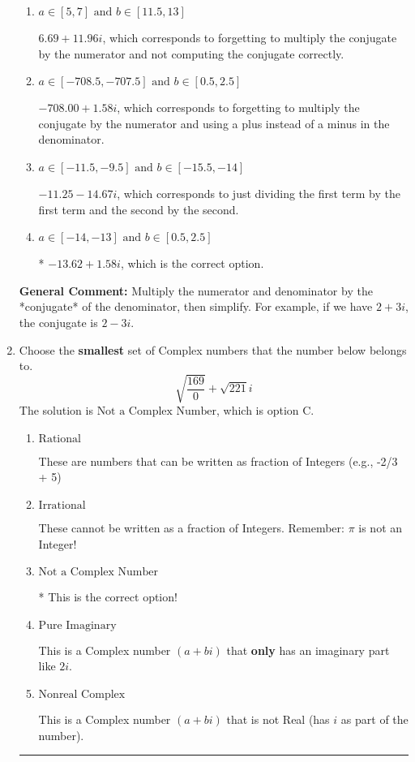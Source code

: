 \documentclass{extbook}[14pt]
\newcommand{\litem}[1]{\item #1

\rule{\textwidth}{0.4pt}}
\begin{document}
\begin{enumerate}
{\begin{enumerate}[label=\Alph*.]
 $-13.62  + 82.00 i$, which corresponds to forgetting to multiply the conjugate by the numerator.
\item \( a \in [5, 7] \text{ and } b \in [11.5, 13] \)

 $6.69  + 11.96 i$, which corresponds to forgetting to multiply the conjugate by the numerator and not computing the conjugate correctly.
\item \( a \in [-708.5, -707.5] \text{ and } b \in [0.5, 2.5] \)

 $-708.00  + 1.58 i$, which corresponds to forgetting to multiply the conjugate by the numerator and using a plus instead of a minus in the denominator.
\item \( a \in [-11.5, -9.5] \text{ and } b \in [-15.5, -14] \)

 $-11.25  - 14.67 i$, which corresponds to just dividing the first term by the first term and the second by the second.
\item \( a \in [-14, -13] \text{ and } b \in [0.5, 2.5] \)

* $-13.62  + 1.58 i$, which is the correct option.
\end{enumerate}

\textbf{General Comment:} Multiply the numerator and denominator by the *conjugate* of the denominator, then simplify. For example, if we have $2+3i$, the conjugate is $2-3i$.
}
\litem{
Choose the \textbf{smallest} set of Complex numbers that the number below belongs to.
\[ \sqrt{\frac{169}{0}}+\sqrt{221} i \]The solution is \( \text{Not a Complex Number} \), which is option C.\begin{enumerate}[label=\Alph*.]
\item \( \text{Rational} \)

These are numbers that can be written as fraction of Integers (e.g., -2/3 + 5)
\item \( \text{Irrational} \)

These cannot be written as a fraction of Integers. Remember: $\pi$ is not an Integer!
\item \( \text{Not a Complex Number} \)

* This is the correct option!
\item \( \text{Pure Imaginary} \)

This is a Complex number $(a+bi)$ that \textbf{only} has an imaginary part like $2i$.
\item \( \text{Nonreal Complex} \)

This is a Complex number $(a+bi)$ that is not Real (has $i$ as part of the number).
\end{enumerate}

}
\end{enumerate}
\end{document}
